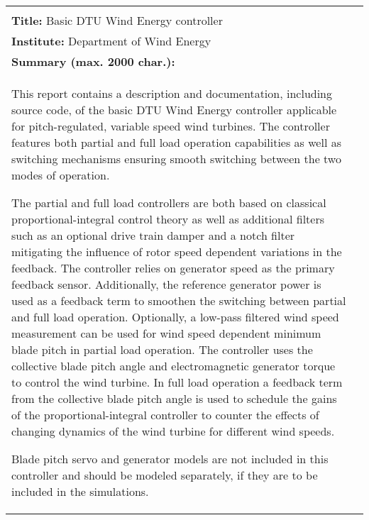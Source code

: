 \thispagestyle{empty}

\begin{tabular}{l|l}
\small
%
\begin{minipage}[t][22cm][t]{9cm}
  \raggedright
  \textbf{Author(s):} Morten Hartvig Hansen and Lars Christian Henriksen\\
  \textbf{Title:} Basic DTU Wind Energy controller \\
  \textbf{Institute:} Department of Wind Energy \\[2em]
  \textbf{Summary (max. 2000 char.):} \\
 This report contains a description and documentation, including source code, of the basic DTU Wind Energy controller applicable for pitch-regulated, variable speed wind turbines. The controller features both partial and full load operation capabilities as well as switching mechanisms ensuring smooth switching between the two modes of operation.

The partial and full load controllers are both based on classical proportional-integral control theory as well as additional filters such as an optional drive train damper and a notch filter mitigating the influence of rotor speed dependent variations in the feedback. The controller relies on generator speed as the primary feedback sensor. Additionally, the reference generator power is used as a feedback term to smoothen the switching between partial and full load operation. Optionally, a low-pass filtered wind speed measurement can be used for wind speed dependent minimum blade pitch in partial load operation. The controller uses the collective blade pitch angle and electromagnetic generator torque to control the wind turbine. In full load operation a feedback term from the collective blade pitch angle is used to schedule the gains of the proportional-integral controller to counter the effects of changing dynamics of the wind turbine for different wind speeds.

Blade pitch servo and generator models are not included in this controller and should be modeled separately, if they are to be included in the simulations.


\end{minipage}
\end{tabular}
